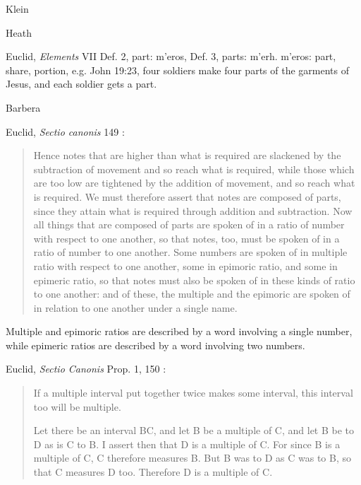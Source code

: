 \documentclass{amsart}
\newcommand{\textgreek}[1]{\begingroup\fontencoding{LGR}\selectfont#1\endgroup}
\theoremstyle{definition}
\begin{document}
Klein \cite{klein}











Heath \cite{euclidII}

Euclid, {\em Elements} VII Def. 2, part: \textgreek{m'eros}, Def. 3, parts: \textgreek{m'erh}.
\textgreek{m'eros}: part, share, portion, e.g. John 19:23, four soldiers make four parts of the garments of Jesus,
and each soldier gets a part.















Barbera \cite{barbera}

Euclid, {\em Sectio canonis} 149 \cite[p.~192]{barker}:

\begin{quote}
Hence notes
that are higher than what is required are slackened by the subtraction of
movement and so reach what is required, while those which are too low are
tightened by the addition of movement, and so reach what is required. We
must therefore assert that notes are composed of parts, since they attain what
is required through addition and subtraction. Now all things that are composed
of parts are spoken of in a ratio of number with respect to one another, so that
notes, too, must be spoken of in a ratio of number to one another. Some
numbers are spoken of in multiple ratio with respect to one another, some in
epimoric ratio, and some in epimeric ratio, so that notes must also be spoken
of in these kinds of ratio to one another:  and of these, the multiple and the
epimoric are spoken of in relation to one another under a single name.
\end{quote}

Multiple and epimoric ratios are described by a word involving a single number, while epimeric
ratios are described by a word involving two numbers.

Euclid, {\em Sectio Canonis} Prop. 1, 150 \cite[p.~194]{barker}:

\begin{quote}
If a multiple interval put together twice makes some
interval, this interval too will be multiple.

Let there be an interval BC, and let B be a multiple of C,
and let B be to D as is C to B. I assert then that D is a
multiple of C. For since B is a multiple of C, C therefore
measures B. But B was to D as C was to B, so that C
measures D too. Therefore D is a multiple of C.
\end{quote}
\end{document}
